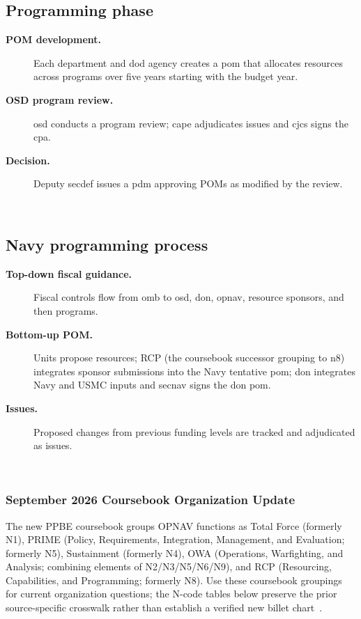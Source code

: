 \documentclass[../main.tex]{subfiles}
\begin{document}
\subsection{Programming phase}
\begin{description}
  \item[\textbf{POM development.}] Each department and \ac{dod} agency creates a \ac{pom} that allocates resources across programs over five years starting with the budget year.
  \item[\textbf{OSD program review.}] \ac{osd} conducts a program review; \ac{cape} adjudicates issues and \ac{cjcs} signs the \ac{cpa}.
  \item[\textbf{Decision.}] Deputy \ac{secdef} issues a \ac{pdm} approving POMs as modified by the review.
\end{description}
~

\subsection{Navy programming process}
\begin{description}
  \item[\textbf{Top-down fiscal guidance.}] Fiscal controls flow from \ac{omb} to \ac{osd}, \ac{don}, \ac{opnav}, resource sponsors, and then programs.
  \item[\textbf{Bottom-up POM.}] Units propose resources; RCP (the coursebook successor grouping to \ac{n8}) integrates sponsor submissions into the Navy tentative \ac{pom}; \ac{don} integrates Navy and USMC inputs and \ac{secnav} signs the \ac{don} \ac{pom}.
  \item[\textbf{Issues.}] Proposed changes from previous funding levels are tracked and adjudicated as issues.
\end{description}
~

\subsubsection{September 2026 Coursebook Organization Update}
The new PPBE coursebook groups OPNAV functions as Total Force (formerly N1), PRIME (Policy, Requirements, Integration, Management, and Evaluation; formerly N5), Sustainment (formerly N4), OWA (Operations, Warfighting, and Analysis; combining elements of N2/N3/N5/N6/N9), and RCP (Resourcing, Capabilities, and Programming; formerly N8). Use these coursebook groupings for current organization questions; the N-code tables below preserve the prior source-specific crosswalk rather than establish a verified new billet chart~\autocite{edo-3-1-1-ppbe-2025}.
\end{document}
